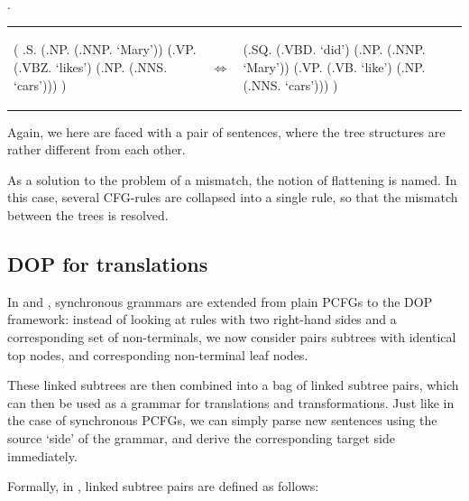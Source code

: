 \documentclass[a4paper]{article}
\theoremstyle{definition}
\begin{document}
\ex. \label{marylike}

\begin{tabular}{lll}
\begin{parsetree}
( .S.
    (.NP. (.NNP. `Mary'))
    (.VP. (.VBZ. `likes')
      (.NP. (.NNS. `cars')))
)
\end{parsetree}
& $\iff$ &
\begin{parsetree}
  (.SQ. (.VBD. `did')
    (.NP. (.NNP. `Mary'))
    (.VP. (.VB. `like')
      (.NP. (.NNS. `cars')))
    )
\end{parsetree}
\end{tabular}
\vspace{1em}

Again, we here are faced with a pair of sentences, where the tree structures
are rather different from each other.

As a solution to the problem of a mismatch, the notion of flattening is named.
In this case, several CFG-rules are collapsed into a single rule, so that the
mismatch between the trees is resolved.

\subsection{DOP for translations}

In \cite{Po} and \cite{Po2}, synchronous grammars are extended from plain
PCFGs to the DOP framework: instead of looking at rules with two right-hand
sides and a corresponding set of non-terminals, we now consider pairs
subtrees with identical top nodes, and corresponding non-terminal leaf nodes.

These linked subtrees are then combined into a bag of linked subtree pairs,
which can then be used as a grammar for translations and transformations. Just
like in the case of synchronous PCFGs, we can simply parse new sentences using
the source `side' of the grammar, and derive the corresponding target side
immediately.

Formally, in \cite{Po}, linked subtree pairs are defined as follows:
\end{document}
